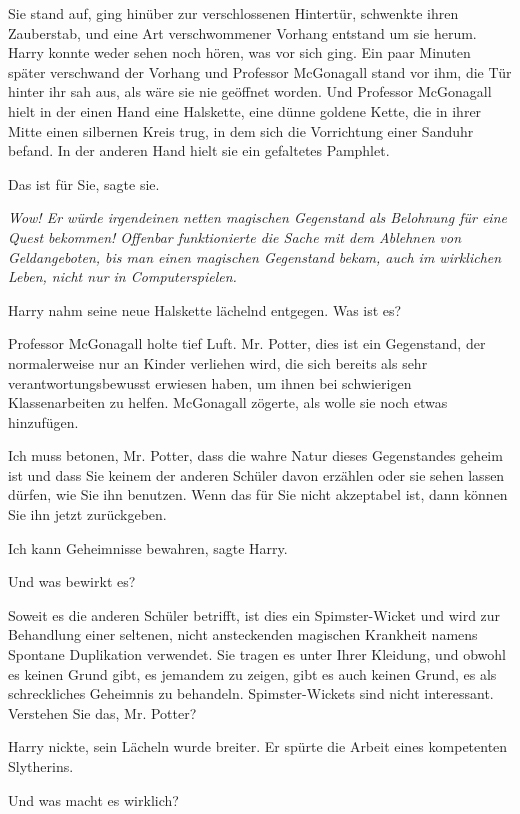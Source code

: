 Sie stand auf, ging hinüber zur verschlossenen Hintertür, schwenkte ihren
Zauberstab, und eine Art verschwommener Vorhang entstand um sie herum. Harry
konnte weder sehen noch hören, was vor sich ging. Ein paar Minuten später
verschwand der Vorhang und Professor McGonagall stand vor ihm, die Tür hinter
ihr sah aus, als wäre sie nie geöffnet worden. Und Professor McGonagall hielt in
der einen Hand eine Halskette, eine dünne goldene Kette, die in ihrer Mitte
einen silbernen Kreis trug, in dem sich die Vorrichtung einer Sanduhr befand. In
der anderen Hand hielt sie ein gefaltetes Pamphlet.

\glqq Das ist für Sie\grqq{}, sagte sie.

\emph{Wow! Er würde irgendeinen netten magischen Gegenstand als Belohnung für
eine Quest bekommen! Offenbar funktionierte die Sache mit dem Ablehnen von
Geldangeboten, bis man einen magischen Gegenstand bekam, auch im wirklichen
Leben, nicht nur in Computerspielen.}

Harry nahm seine neue Halskette lächelnd entgegen. \glqq Was ist es?\grqq{}

Professor McGonagall holte tief Luft. \glqq Mr. Potter, dies ist ein Gegenstand,
der normalerweise nur an Kinder verliehen wird, die sich bereits als sehr
verantwortungsbewusst erwiesen haben, um ihnen bei schwierigen Klassenarbeiten
zu helfen.\grqq{} McGonagall zögerte, als wolle sie noch etwas hinzufügen.

\glqq Ich muss betonen, Mr. Potter, dass die wahre Natur dieses Gegenstandes
geheim ist und dass Sie keinem der anderen Schüler davon erzählen oder sie sehen
lassen dürfen, wie Sie ihn benutzen. Wenn das für Sie nicht akzeptabel ist, dann
können Sie ihn jetzt zurückgeben.\grqq{}

\glqq Ich kann Geheimnisse bewahren\grqq{}, sagte Harry.

\glqq Und was bewirkt es?\grqq{}

\glqq Soweit es die anderen Schüler betrifft, ist dies ein Spimster-Wicket und
wird zur Behandlung einer seltenen, nicht ansteckenden magischen Krankheit
namens Spontane Duplikation verwendet. Sie tragen es unter Ihrer Kleidung, und
obwohl es keinen Grund gibt, es jemandem zu zeigen, gibt es auch keinen Grund,
es als schreckliches Geheimnis zu behandeln. Spimster-Wickets sind nicht
interessant. Verstehen Sie das, Mr. Potter?\grqq{}

Harry nickte, sein Lächeln wurde breiter. Er spürte die Arbeit eines kompetenten
Slytherins.

\glqq Und was macht es wirklich?\grqq{}

